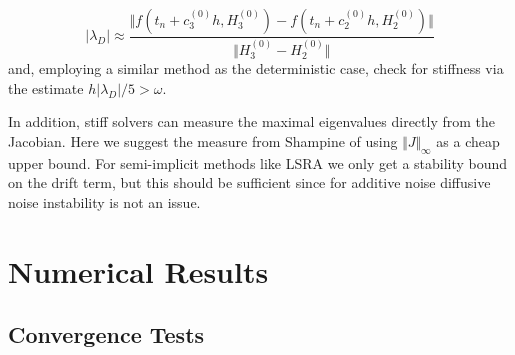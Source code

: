 \documentclass{article}
\begin{document}
\begin{equation}
\left|\lambda_{D}\right|\approx\frac{\Vert f\left(t_{n}+c_{3}^{(0)}h,H_{3}^{(0)}\right)-f\left(t_{n}+c_{2}^{(0)}h,H_{2}^{(0)}\right)\Vert}{\Vert H_{3}^{(0)}-H_{2}^{(0)}\Vert}\label{eq:SOSRA_eigen}
\end{equation}
and, employing a similar method as the deterministic case, check
for stiffness via the estimate $h\left|\lambda_{D}\right|/5>\omega$.

In addition, stiff solvers can measure the maximal eigenvalues directly
from the Jacobian. Here we suggest the measure from Shampine \cite{RN3527,RN3526,RN3790}
of using $\Vert J\Vert_{\infty}$ as a cheap upper bound. For semi-implicit
methods like LSRA we only get a stability bound on the drift term,
but this should be sufficient since for additive noise diffusive noise
instability is not an issue.

\section{Numerical Results}

\subsection{Convergence Tests \label{subsec:Convergence-Tests}}
\end{document}
